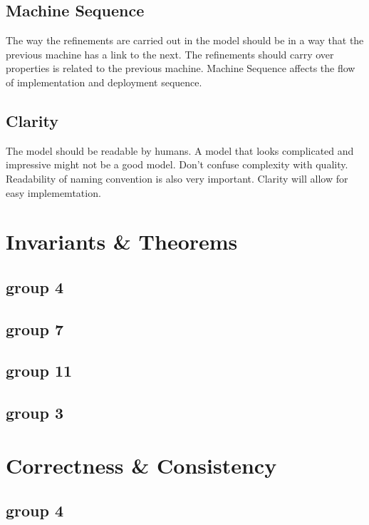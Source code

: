 \subsection{Machine Sequence}
\label{machinesequence}

The way the refinements are carried out in the model should be in a way that the previous machine has a link to the next. The refinements should carry over properties is related to the previous machine. Machine Sequence affects the flow of implementation and deployment sequence.

\subsection{Clarity}
\label{clarity}

The model should be readable by humans. A model that looks complicated and impressive might not be a good model. Don't confuse complexity with quality. Readability of naming convention is also very important. Clarity will allow for easy implememtation.

\section{Invariants \& Theorems}
\label{invariantstheorems}

\subsection{group 4}
\label{group4}

\subsection{group 7}
\label{group7}

\subsection{group 11}
\label{group11}

\subsection{group 3}
\label{group3}

\section{Correctness \& Consistency}
\label{correctnessconsistency}

\subsection{group 4}
\label{group4}

